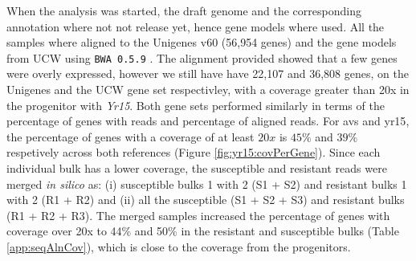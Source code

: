 

When the analysis was started, the draft genome and the corresponding annotation where not not release yet, hence gene models where used. 
All the samples where aligned to the Unigenes v60 (56,954 genes) and the gene models from UCW \citep{Krasileva2013} using \verb|BWA 0.5.9| \citep{Li2009}. 
The alignment provided showed that a few genes were overly expressed, however we still have have 22,107 and 36,808 genes, on the Unigenes and the UCW gene set respectivley,  with a coverage greater than 20x in the progenitor with \textit{Yr15}. 
Both gene sets performed similarly in terms of the percentage of genes with reads and percentage of aligned reads. 
For \gls{avs} and \gls{yr15}, the percentage of genes with a coverage of at least $20x$ is $45\%$ and $39\%$ respetively across both references (Figure \ref{fig:yr15:covPerGene}).
Since each individual bulk has a lower coverage, the susceptible and resistant reads were merged \textit{in silico} as: (i) susceptible bulks 1 with 2 (S1 + S2) and resistant bulks 1 with 2 (R1 + R2) and (ii) all the susceptible (S1 + S2 + S3) and resistant bulks (R1 + R2 + R3). 
The merged samples increased the percentage of genes with coverage over 20x  to 44\% and 50\% in the resistant and susceptible bulks (Table \ref{app:seqAlnCov}), which is close to the coverage from the progenitors.

